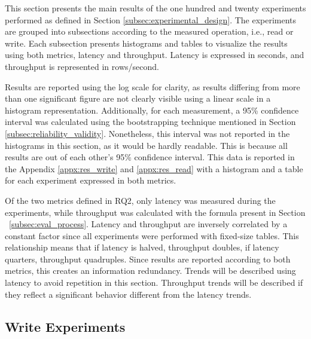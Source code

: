This section presents the main results of the one hundred and twenty experiments performed as defined in Section \ref{subsec:experimental_design}. The experiments are grouped into subsections according to the measured operation, i.e., read or write. Each subsection presents histograms and tables to visualize the results using both metrics, latency and throughput. Latency is expressed in seconds, and throughput is represented in rows/second.

Results are reported using the log scale for clarity, as results differing from more than one significant figure are not clearly visible using a linear scale in a histogram representation. Additionally, for each measurement, a 95\% confidence interval was calculated using the bootstrapping technique mentioned in Section \ref{subsec:reliability_validity}. Nonetheless, this interval was not reported in the histograms in this section, as it would be hardly readable. This is because all results are out of each other's 95\% confidence interval. This data is reported in the Appendix \ref{appx:res_write} and \ref{appx:res_read} with a histogram and a table for each experiment expressed in both metrics.

Of the two metrics defined in RQ2, only latency was measured during the experiments, while throughput was calculated with the formula present in Section ~\ref{subsec:eval_process}. Latency and throughput are inversely correlated by a constant factor since all experiments were performed with fixed-size tables. This relationship means that if latency is halved, throughput doubles, if latency quarters, throughput quadruples. Since results are reported according to both metrics, this creates an information redundancy. Trends will be described using latency to avoid repetition in this section. Throughput trends will be described if they reflect a significant behavior different from the latency trends.

\subsection{Write Experiments}

